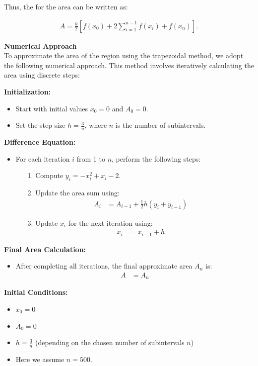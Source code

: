 \documentclass[article]{IEEEtran}
\numberwithin{figure}{enumi}
\begin{document}
Thus, the for the area can be written as:

\begin{align}
  A = \frac{h}{2} \left[ f(x_0) + 2\sum_{i=1}^{n-1} f(x_i) + f(x_n) \right].  
\end{align}


\textbf{Numerical Approach}\\

To approximate the area of the region using the trapezoidal method, we adopt the following numerical approach. This method involves iteratively calculating the area using discrete steps:

\textbf{Initialization:}
\begin{itemize}
    \item Start with initial values $x_0 = 0$ and $A_0 = 0$.
    \item Set the step size $h = \frac{3}{n}$, where $n$ is the number of subintervals.
\end{itemize}

\textbf{Difference Equation:}\\
\begin{itemize}
    \item For each iteration $i$ from 1 to $n$, perform the following steps:
    \begin{itemize}
        \item[1.] Compute $y_i = -x_i^2 + x_i - 2$.
        \item[2.] Update the area sum using:
        \begin{align}
        A_{i} &= A_{i-1} + \frac{1}{2} h (y_{i} + y_{i-1})
        \end{align}
        \item[3.] Update $x_i$ for the next iteration using:
        \begin{align}
        x_{i} &= x_{i-1} + h
        \end{align}
    \end{itemize}
\end{itemize}

\textbf{Final Area Calculation:}\\
\begin{itemize}
    \item After completing all iterations, the final approximate area $A_n$ is:
    \begin{align}
    A &= A_n
    \end{align}
\end{itemize}

\textbf{Initial Conditions:}
\begin{itemize}
    \item $x_0 = 0$
    \item $A_0 = 0$
    \item $h = \frac{3}{n}$ (depending on the chosen number of subintervals $n$)
    \item Here we assume $n = 500$.
\end{itemize}
\end{document}
